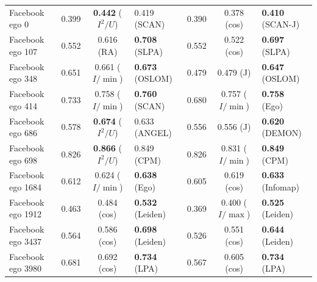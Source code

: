 \begin{table}[t]
\begin{ruledtabular}
\begin{tabular}{l|ccl|ccl}
Facebook ego 0 & 0.399 & \textbf{0.442} ($I^2/U$) & 0.419 (SCAN) & 0.390 & 0.378 (cos) & \textbf{0.410} (SCAN-J) \\
Facebook ego 107 & 0.552 & 0.616 (RA) & \textbf{0.708} (SLPA) & 0.552 & 0.522 (cos) & \textbf{0.697} (SLPA) \\
Facebook ego 348 & 0.651 & 0.661 ($I/\min$) & \textbf{0.673} (OSLOM) & 0.479 & 0.479 (J) & \textbf{0.647} (OSLOM) \\
Facebook ego 414 & 0.733 & 0.758 ($I/\min$) & \textbf{0.760} (SCAN) & 0.680 & 0.757 ($I/\min$) & \textbf{0.758} (Ego) \\
Facebook ego 686 & 0.578 & \textbf{0.674} ($I^2/U$) & 0.633 (ANGEL) & 0.556 & 0.556 (J) & \textbf{0.620} (DEMON) \\
Facebook ego 698 & 0.826 & \textbf{0.866} ($I^2/U$) & 0.849 (CPM) & 0.826 & 0.831 ($I/\min$) & \textbf{0.849} (CPM) \\
Facebook ego 1684 & 0.612 & 0.624 ($I/\min$) & \textbf{0.638} (Ego) & 0.605 & 0.619 (cos) & \textbf{0.633} (Infomap) \\
Facebook ego 1912 & 0.463 & 0.484 (cos) & \textbf{0.532} (Leiden) & 0.369 & 0.400 ($I/\max$) & \textbf{0.525} (Leiden) \\
Facebook ego 3437 & 0.564 & 0.586 (cos) & \textbf{0.698} (Leiden) & 0.526 & 0.551 (cos) & \textbf{0.644} (Leiden) \\
Facebook ego 3980 & 0.681 & 0.692 (cos) & \textbf{0.734} (LPA) & 0.567 & 0.605 (cos) & \textbf{0.734} (LPA) \\
\end{tabular}
\end{ruledtabular}
\end{table}
